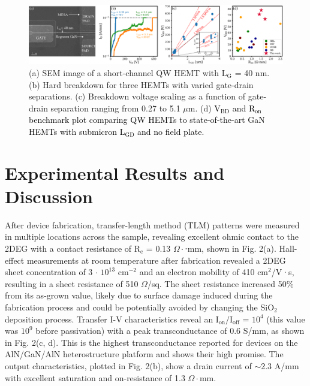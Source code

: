 \documentclass[journal]{IEEEtran}
\begin{document}
\begin{figure}[!t]
\centering
\includegraphics[width=\textwidth]{Figure4_bigger_inset.eps}
\caption{ (a) SEM image of a short-channel QW HEMT with $\mathrm{L_G}$ = 40 nm. (b) Hard breakdown for three HEMTs with varied gate-drain separations. (c) Breakdown voltage scaling as a function of gate-drain separation ranging from 0.27 to 5.1 $\mu$m. (d) \textcolor{black}{$\mathrm{V_{BD}}$ and $\mathrm{R_{on}}$ benchmark plot comparing QW HEMTs to state-of-the-art GaN HEMTs with submicron $\mathrm{L_{GD}}$ and no field plate.} }
\label{fig:benchmark}
\end{figure}

\section{Experimental Results and Discussion}
\label{sec:Experimental Results and Discussion}
After device fabrication, transfer-length method (TLM) patterns were measured in multiple locations across the sample, revealing excellent ohmic contact to the 2DEG with a contact resistance of $\mathrm{R_c}$ = 0.13 $\Omega\cdot$⋅mm, shown in Fig. 2(a). Hall-effect measurements at room temperature after fabrication revealed a 2DEG sheet concentration of 3 $\cdot$ $\mathrm{10^{13}}$ $\mathrm{cm^{-2}}$ and an electron mobility of 410 $\mathrm{cm^2}$/V·s, resulting in a sheet resistance of 510 $\Omega$/sq. The sheet resistance increased 50\% from its as-grown value, likely due to surface damage induced during the fabrication process and could be potentially avoided by changing the $\mathrm{SiO_2}$ deposition process. Transfer I-V characteristics reveal an $\mathrm{I_{on}}/\mathrm{I_{off}}$ = $\mathrm{10^4}$ (this value was $\mathrm{10^9}$ before passivation) with a peak transconductance of 0.6 S/mm, as shown in Fig. 2(c, d). This is the highest transconductance reported for devices on the AlN/GaN/AlN heterostructure platform and shows their high promise. The output characteristics, plotted in Fig. 2(b), show a drain current of $\sim$2.3 A/mm with excellent saturation and on-resistance of 1.3 $\Omega\cdot$mm.
\end{document}
